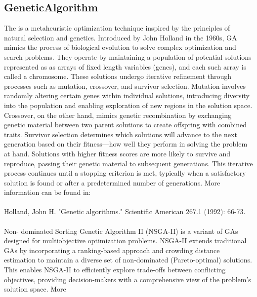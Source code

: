 \subsection{GeneticAlgorithm}
  The  is a metaheuristic optimization technique inspired by the
  principles                             of natural selection and genetics. Introduced by John
  Holland in the 1960s, GA mimics the process of                             biological evolution to
  solve complex optimization and search problems. They operate by maintaining a population of
  potential solutions represented as as arrays of fixed length variables (genes), and each such
  array is called a chromosome.                             These solutions undergo iterative
  refinement through processes such as mutation, crossover, and survivor selection. Mutation
  involves randomly altering certain genes within                             individual solutions,
  introducing diversity into the population and enabling exploration of new regions in the solution
  space.                             Crossover, on the other hand, mimics genetic recombination by
  exchanging genetic material between two parent solutions to create
  offspring with combined traits. Survivor selection determines which solutions will advance to the
  next generation based on                             their fitness—how well they perform in
  solving the problem at hand. Solutions with higher fitness scores are more likely to
  survive and reproduce, passing their genetic material to subsequent generations. This iterative
  process continues                             until a stopping criterion is met, typically when a
  satisfactory solution is found or after a predetermined number of generations.
  More information can be found in:\\\\                              Holland, John H. "Genetic
  algorithms." Scientific American 267.1 (1992): 66-73.\\\\                              Non-
  dominated Sorting Genetic Algorithm II (NSGA-II) is a variant of GAs designed for multiobjective
  optimization problems.                             NSGA-II extends traditional GAs by
  incorporating a ranking-based approach and crowding distance estimation to maintain a diverse set
  of                             non-dominated (Pareto-optimal) solutions. This enables NSGA-II to
  efficiently explore trade-offs between conflicting objectives,
  providing decision-makers with a comprehensive view of the problem's solution space. More
